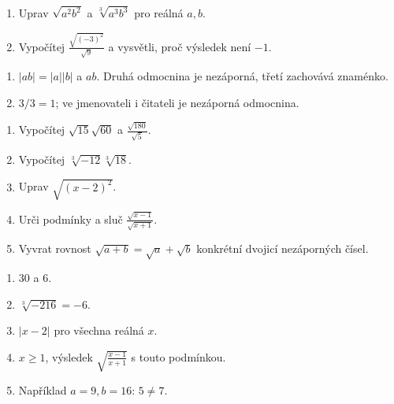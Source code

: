 \documentclass[11pt,a4paper]{article}
\begin{document}
\begin{zadaniReseniBox}[title={Rezerva: sudá a lichá odmocnina},breakable=false]
\begin{enumerate}[label=\alph*)]
\item Uprav $\sqrt{a^2b^2}$ a $\sqrt[3]{a^3b^3}$ pro reálná $a,b$.
\item Vypočítej $\frac{\sqrt{(-3)^2}}{\sqrt{9}}$ a vysvětli, proč výsledek není $-1$.
\end{enumerate}
\tcblower
\begin{enumerate}[label=\alph*)]
\item $|ab|=|a||b|$ a $ab$. Druhá odmocnina je nezáporná, třetí zachovává znaménko.
\item $3/3=1$; ve jmenovateli i čitateli je nezáporná odmocnina.
\end{enumerate}
\end{zadaniReseniBox}




\begin{zadaniReseniBox}[title={Domácí úlohy},breakable=false]
\begin{enumerate}[label=\alph*)]
\item Vypočítej $\sqrt{15}\sqrt{60}$ a $\frac{\sqrt{180}}{\sqrt5}$.
\item Vypočítej $\sqrt[3]{-12}\sqrt[3]{18}$.
\item Uprav $\sqrt{(x-2)^2}$.
\item Urči podmínky a sluč $\frac{\sqrt{x-1}}{\sqrt{x+1}}$.
\item Vyvrat rovnost $\sqrt{a+b}=\sqrt a+\sqrt b$ konkrétní dvojicí nezáporných čísel.
\end{enumerate}
\tcblower
\begin{enumerate}[label=\alph*)]
\item $30$ a $6$.
\item $\sqrt[3]{-216}=-6$.
\item $|x-2|$ pro všechna reálná $x$.
\item $x\ge1$, výsledek $\sqrt{\frac{x-1}{x+1}}$ s touto podmínkou.
\item Například $a=9,b=16$: $5\ne7$.
\end{enumerate}
\end{zadaniReseniBox}
\end{document}
